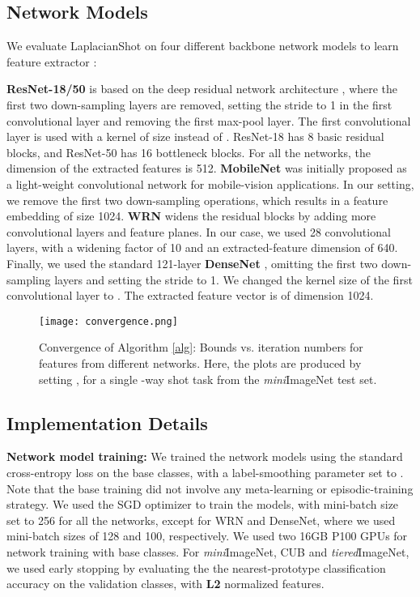 \documentclass{article}
\begin{document}
\subsection{Network Models}
We evaluate LaplacianShot on four different backbone network models to learn feature extractor : 

\textbf{ResNet-18/50} is based on the deep residual network architecture \cite{he2016deep}, where the first two down-sampling layers are removed, setting the stride to 1 in the first convolutional layer and removing the first max-pool layer. The first convolutional layer is used with a kernel of size  instead of . ResNet-18 has 8 basic residual blocks, and  ResNet-50 has 16 bottleneck blocks. For all the networks, the dimension of the extracted features is 512. \textbf{MobileNet} \cite{mobilenet} was initially proposed as a light-weight convolutional network for mobile-vision applications. In our setting, we remove the first two down-sampling operations, which results in a feature embedding of size 1024. \textbf{WRN} \cite{WRN} widens the residual blocks by adding more convolutional layers and feature planes. In our case, we used 28 convolutional layers, with a widening factor of 10 and an extracted-feature dimension of 640. Finally, we used the standard 121-layer \textbf{DenseNet} \cite{densenet}, omitting the first two down-sampling layers and setting the stride to 1. We changed the kernel size of the first convolutional layer to . The extracted feature vector is of dimension 1024.

\begin{figure*}[tb]
\vskip 0.1in
\begin{center}
\centerline{\texttt{[image: convergence.png]}}
\caption{Convergence of Algorithm \ref{alg}:  Bounds  vs. iteration numbers for features from different networks. Here, the plots are produced by setting , for a single -way  shot task from the \textit{mini}ImageNet test set.}
\label{fig:convergence}
\end{center}
\vskip -0.1in
\end{figure*}

\subsection{Implementation Details}
\textbf{Network model training:} We trained the network models using the standard cross-entropy loss on the base classes, with a label-smoothing \cite{szegedy2016rethinking} parameter set to .
Note that the base training did not involve any meta-learning or episodic-training strategy. 
We used the SGD optimizer to train the models, with  
mini-batch size set to 256 for all the networks, except for WRN and DenseNet, where we used mini-batch sizes of 128 and 100, respectively. We used two 16GB P100 GPUs for network training with base classes. 
For \textit{mini}ImageNet, CUB and \textit{tiered}ImageNet, we used early stopping by evaluating the the nearest-prototype classification accuracy on the validation classes, with \textbf{L2} normalized features.
\end{document}
